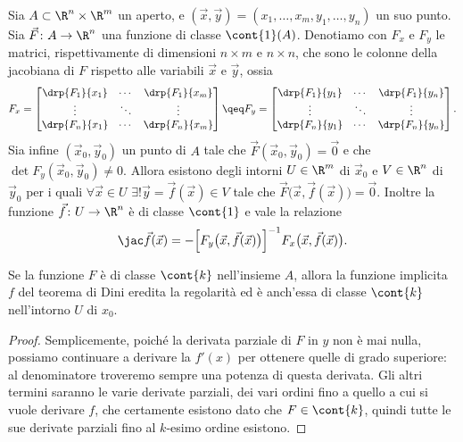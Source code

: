 \begin{teorema} \label{t:dini-Rn}
	Sia $A\subset\R^n\times\R^m$ un aperto, e $(\vec x,\vec y)=(x_1,\dots,x_m,y_1,\dots,y_n)$ un suo punto.
	Sia $\vec F\colon A\to\R^n$ una funzione di classe $\cont{1}(A)$.
	Denotiamo con $F_x$ e $F_y$ le matrici, rispettivamente di dimensioni $n\times m$ e $n\times n$, che sono le colonne della jacobiana di $F$ rispetto alle variabili $\vec x$ e $\vec y$, ossia
	\[
	F_x=
		\begin{bmatrix}
		\drp{F_1}{x_1}	&\cdots	&\drp{F_1}{x_m}\\
		\vdots			&\ddots	&\vdots\\
		\drp{F_n}{x_1}	&\cdots	&\drp{F_n}{x_m}
		\end{bmatrix}
	\qeq
	F_y=
		\begin{bmatrix}
		\drp{F_1}{y_1}	&\cdots	&\drp{F_1}{y_n}\\
		\vdots			&\ddots	&\vdots\\
		\drp{F_n}{y_1}	&\cdots	&\drp{F_n}{y_n}
		\end{bmatrix}.
	\]
	Sia infine $(\vec x_0,\vec y_0)$ un punto di $A$ tale che $\vec F(\vec x_0,\vec y_0)=\vec 0$ e che $\det F_y(\vec x_0,\vec y_0)\neq 0$.
	Allora esistono degli intorni $U\in\R^m$ di $\vec x_0$ e $V\in\R^n$ di $\vec y_0$ per i quali $\forall\vec x\in U$ $\exists! \vec y=\vec f(\vec x)\in V$ tale che $\vec F\big(\vec x,\vec f(\vec x)\big)=\vec 0$.
	Inoltre la funzione $\vec f\colon U\to\R^n$ è di classe $\cont{1}$ e vale la relazione
	\begin{equation} \label{eq:dini-Rn}
		\jac\vec f(\vec x)=-\Big[F_y\big(\vec x,\vec f(\vec x)\big)\Big]^{-1}F_x\big(\vec x,\vec f(\vec x)\big).
	\end{equation}
\end{teorema}
\begin{corollario}
	Se la funzione $F$ è di classe $\cont{k}$ nell'insieme $A$, allora la funzione implicita $f$ del teorema di Dini eredita la regolarità ed è anch'essa di classe $\cont{k}$ nell'intorno $U$ di $x_0$.
\end{corollario}
\begin{proof}
	Semplicemente, poiché la derivata parziale di $F$ in $y$ non è mai nulla, possiamo continuare a derivare la $f'(x)$ per ottenere quelle di grado superiore: al denominatore troveremo sempre una potenza di questa derivata.
	Gli altri termini saranno le varie derivate parziali, dei vari ordini fino a quello a cui si vuole derivare $f$, che certamente esistono dato che $F\in\cont{k}$, quindi tutte le sue derivate parziali fino al $k$-esimo ordine esistono.
\end{proof}
